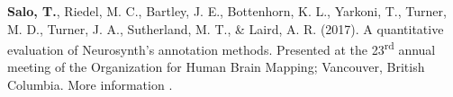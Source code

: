 \documentclass[10pt]{article}
\newcommand{\sectionstyle}{\LARGE \fontfamily{pcr}\selectfont}
\newcommand{\textlink}[3][blue]{\href{#2}{\color{#1}{#3}}}%
\begin{document}
\bigskip

\begin{center}\sectionstyle{POSTERS}\end{center}

\begin{hangparas}{.25in}{1}
\textbf{Salo, T.}, Riedel, M. C., Bartley, J. E., Bottenhorn, K. L., Yarkoni, T.,
Turner, M. D., Turner, J. A., Sutherland, M. T., \& Laird, A. R. (2017).
A quantitative evaluation of Neurosynth's annotation methods. Presented at
the 23\textsuperscript{rd} annual meeting of the Organization for Human Brain
Mapping; Vancouver, British Columbia. More information
\textlink{https://nbclab.github.io/posters/salo-neurosynth-poster}{here}.
\end{hangparas}

\bigskip
\end{document}
